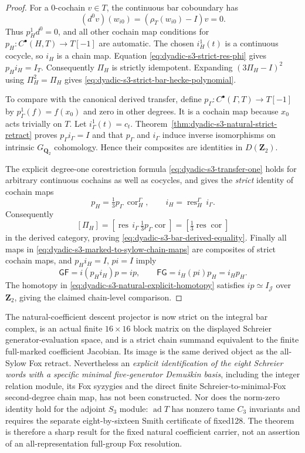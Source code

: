 \begin{proof}
For a $0$-cochain $v\in T$,
the continuous bar coboundary
has
\[
(d^0v)(w_{i0})
=(\rho_T(w_{i0})-I)v=0.
\]
Thus $p_H^1d^0=0$,
and all other cochain
map conditions for
$p_H:C^\bullet(H,T)\to T[-1]$
are automatic.
The chosen $i_H^1(t)$
is a continuous cocycle,
so $i_H$ is a chain map.
Equation
\eqref{eq:dyadic-s3-strict-res-phi}
gives $p_Hi_H=I_T$.
Consequently $\Pi_H$
is strictly idempotent.
Expanding
$(3\Pi_H-I)^2$
using $\Pi_H^2=\Pi_H$
gives
\eqref{eq:dyadic-s3-strict-bar-hecke-polynomial}.

To compare with the canonical
derived transfer, define
$p_\Gamma:C^\bullet(\Gamma,T)\to T[-1]$
by $p_\Gamma^1(f)=f(x_0)$
and zero in other degrees.
It is a cochain map because
$x_0$ acts trivially on $T$.
Let $i_\Gamma^1(t)=c_t$.
Theorem~\ref{thm:dyadic-s3-natural-strict-retract}
proves $p_\Gamma i_\Gamma=I$
and that $p_\Gamma$ and
$i_\Gamma$ induce inverse
isomorphisms on intrinsic
$G_{\mathbf Q_2}$ cohomology.
Hence their composites are
identities in $D(\mathbf Z_2)$.

The explicit degree-one
corestriction formula
\eqref{eq:dyadic-s3-transfer-one}
holds for arbitrary
continuous cochains as
well as cocycles, and
gives the \emph{strict}
identity of cochain maps
\[
p_H=\tfrac13 p_\Gamma
\,\operatorname{cor}_H^\Gamma,
\qquad
i_H=\operatorname{res}_H^\Gamma
\,i_\Gamma.
\]
Consequently
\[
[\Pi_H]=
\left[\operatorname{res}\,
i_\Gamma\,\tfrac13p_\Gamma
\operatorname{cor}\right]
=\left[\tfrac13\operatorname{res}
\operatorname{cor}\right]
\]
in the derived category,
proving
\eqref{eq:dyadic-s3-bar-derived-equality}.
Finally all maps in
\eqref{eq:dyadic-s3-marked-to-sylow-chain-maps}
are composites of strict
cochain maps, and
$p_Hi_H=I$, $pi=I$
imply
\[
\mathsf G\mathsf F
=i(p_Hi_H)p=ip,\qquad
\mathsf F\mathsf G
=i_H(pi)p_H=i_Hp_H.
\]
The homotopy in
\eqref{eq:dyadic-s3-natural-explicit-homotopy}
satisfies $ip\simeq I_{\mathcal J}$
over $\mathbf Z_2$,
giving the claimed chain-level
comparison.
\end{proof}

\begin{warning}
\label{warn:dyadic-s3-natural-minimal-fox-boundary}
The natural-coefficient descent
projector is now strict on
the integral bar complex,
is an actual finite
$16\times16$ block matrix
on the displayed Schreier
generator-evaluation space,
and is a strict chain
summand equivalent to the
finite full-marked
coefficient Jacobian.
Its image is the same
derived object as the
all-Sylow Fox retract.
Nevertheless an
\emph{explicit identification
of the eight Schreier words
with a specific minimal
five-generator Demu\v{s}kin
basis}, including the
integer relation module,
its Fox syzygies and the
direct finite
Schreier-to-minimal-Fox
second-degree chain map,
has not been constructed.
Nor does the norm-zero
identity hold for the
adjoint $S_3$ module:
$\operatorname{ad}T$ has
nonzero tame $C_3$ invariants
and requires the separate
eight-by-sixteen Smith
certificate of fixed128.
The theorem is therefore
a sharp result for the
fixed natural coefficient
carrier, not an assertion
of an all-representation
full-group Fox resolution.
\end{warning}
